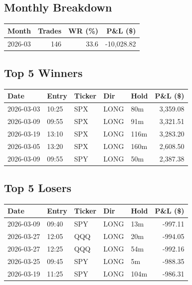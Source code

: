 \documentclass[11pt,a4paper,twoside]{article}
\begin{document}
\subsection{Monthly Breakdown}
\noindent\begin{center}
\begin{tabular}{>{\color{txtmain}}l rrr}
\toprule
\rowcolor{cardbg}
\textbf{Month} & \textbf{Trades} & \textbf{WR (\%)} & \textbf{P\&L (\$)} \\
\midrule
2026-03 & 146 & 33.6 & \textcolor{lossred}{-10,028.82} \\
\bottomrule
\end{tabular}
\end{center}
\subsection{Top 5 Winners}
\noindent\begin{center}
\begin{tabular}{>{\color{txtmain}}l llll r}
\toprule
\rowcolor{cardbg}
\textbf{Date} & \textbf{Entry} & \textbf{Ticker} & \textbf{Dir} & \textbf{Hold} & \textbf{P\&L (\$)} \\
\midrule
2026-03-03 & 10:25 & SPX & LONG & 80m & \textcolor{wingreen}{3,359.08} \\
2026-03-09 & 09:55 & SPX & LONG & 91m & \textcolor{wingreen}{3,321.51} \\
2026-03-19 & 13:10 & SPX & LONG & 116m & \textcolor{wingreen}{3,283.20} \\
2026-03-05 & 13:20 & SPX & LONG & 160m & \textcolor{wingreen}{2,608.50} \\
2026-03-09 & 09:55 & SPY & LONG & 50m & \textcolor{wingreen}{2,387.38} \\
\bottomrule
\end{tabular}
\end{center}
\subsection{Top 5 Losers}
\noindent\begin{center}
\begin{tabular}{>{\color{txtmain}}l llll r}
\toprule
\rowcolor{cardbg}
\textbf{Date} & \textbf{Entry} & \textbf{Ticker} & \textbf{Dir} & \textbf{Hold} & \textbf{P\&L (\$)} \\
\midrule
2026-03-09 & 09:40 & SPY & LONG & 13m & \textcolor{lossred}{-997.11} \\
2026-03-27 & 12:05 & QQQ & LONG & 20m & \textcolor{lossred}{-994.05} \\
2026-03-27 & 12:25 & QQQ & LONG & 54m & \textcolor{lossred}{-992.16} \\
2026-03-25 & 09:45 & SPY & LONG & 5m & \textcolor{lossred}{-988.35} \\
2026-03-19 & 11:25 & SPY & LONG & 104m & \textcolor{lossred}{-986.31} \\
\bottomrule
\end{tabular}
\end{center}
\clearpage
\end{document}
